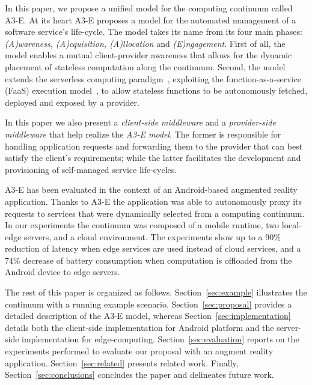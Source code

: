 In this paper, we propose a unified model for the computing continuum called A3-E. At its heart A3-E proposes a model for the automated management of a software service's life-cycle. The model takes its name from its four main phases: \textit{(A)wareness, (A)cquisition, (A)llocation} and \textit{(E)ngagement}. First of all, the model enables a mutual client-provider awareness that allows for the dynamic placement of stateless computation along the continuum. Second, the model extends the serverless computing paradigm~\cite{Hendrickson:2016,baldini2017serverless,GarrigaMendonca2017}, exploiting the function-as-a-service (FaaS) execution model~\cite{MateosFaaster17}, to allow stateless functions to be autonomously fetched, deployed and exposed by a provider. 

In this paper we also present a \textit{client-side middleware} and a \textit{provider-side middleware} that help realize the \textit{A3-E model}. The former is responsible for handling application requests and forwarding them to the provider that can best satisfy the client's requirements; while the latter facilitates the development and provisioning of self-managed service life-cycles. 

A3-E has been evaluated in the context of an Android-based augmented reality application. Thanks to A3-E the application was able to autonomously proxy its requests to services that were dynamically selected from a computing continuum. In our experiments the continuum was composed of a mobile runtime, two local-edge servers, and a cloud environment. The experiments show up to a 90\% reduction of latency when edge services are used instead of cloud services, and a 74\% decrease of battery consumption when computation is offloaded from the Android device to edge servers. 

The rest of this paper is organized as follows.  Section~\ref{sec:example} illustrates the continuum with a running example scenario. Section~\ref{sec:proposal} provides a detailed description of the A3-E model, whereas Section~\ref{sec:implementation} details both the client-side implementation for Android platform and the server-side implementation for edge-computing. Section~\ref{sec:evaluation} reports on the experiments performed to evaluate our proposal with an augment reality application. Section~\ref{sec:related} presents related work. Finally, Section~\ref{sec:conclusions} concludes the paper and delineates future work.

